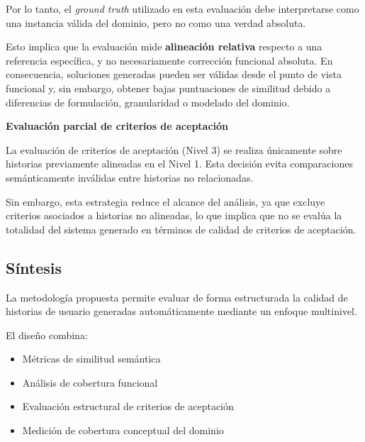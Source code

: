 Por lo tanto, el \textit{ground truth} utilizado en esta evaluación debe interpretarse como una instancia válida del dominio, pero no como una verdad absoluta.

Esto implica que la evaluación mide \textbf{alineación relativa} respecto a una referencia específica, y no necesariamente corrección funcional absoluta. En consecuencia, soluciones generadas pueden ser válidas desde el punto de vista funcional y, sin embargo, obtener bajas puntuaciones de similitud debido a diferencias de formulación, granularidad o modelado del dominio.

\textbf{Evaluación parcial de criterios de aceptación}

La evaluación de criterios de aceptación (Nivel 3) se realiza únicamente sobre historias previamente alineadas en el Nivel 1. Esta decisión evita comparaciones semánticamente inválidas entre historias no relacionadas.

Sin embargo, esta estrategia reduce el alcance del análisis, ya que excluye criterios asociados a historias no alineadas, lo que implica que no se evalúa la totalidad del sistema generado en términos de calidad de criterios de aceptación.

\subsection{Síntesis}

La metodología propuesta permite evaluar de forma estructurada la calidad de historias de usuario generadas automáticamente mediante un enfoque multinivel.

El diseño combina:

\begin{itemize}
    \item Métricas de similitud semántica
    \item Análisis de cobertura funcional
    \item Evaluación estructural de criterios de aceptación
    \item Medición de cobertura conceptual del dominio
\end{itemize}
